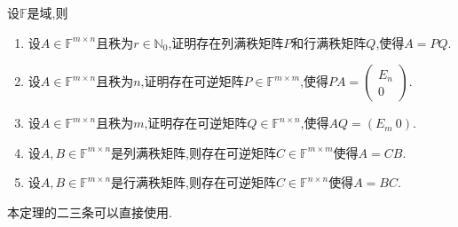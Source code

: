 \documentclass[../../main.tex]{subfiles}
\begin{document}
\begin{theorem}[满秩分解]\label{theorem:满秩分解}
设\( \mathbb{F} \)是域,则
\begin{enumerate}
\item 设\( A \in \mathbb{F}^{m \times n} \)且秩为\( r \in \mathbb{N}_0 \),证明存在列满秩矩阵\( P \)和行满秩矩阵\( Q \),使得\( A = PQ \).

\item 设\( A \in \mathbb{F}^{m \times n} \)且秩为\( n \),证明存在可逆矩阵\( P \in \mathbb{F}^{m \times m} \),使得\( PA = \begin{pmatrix} E_n \\ 0 \end{pmatrix} \).

\item 设\( A \in \mathbb{F}^{m \times n} \)且秩为\( m \),证明存在可逆矩阵\( Q \in \mathbb{F}^{n \times n} \),使得\( AQ = (E_m\ 0) \).

\item 设\( A, B \in \mathbb{F}^{m \times n} \)是列满秩矩阵,则存在可逆矩阵\( C \in \mathbb{F}^{m \times m} \)使得\( A = CB \).

\item 设\( A, B \in \mathbb{F}^{m \times n} \)是行满秩矩阵,则存在可逆矩阵\( C \in \mathbb{F}^{n \times n} \)使得\( A = BC \).
\end{enumerate}
\end{theorem}
\begin{note}
本定理的二三条可以直接使用.
\end{note}
\end{document}
